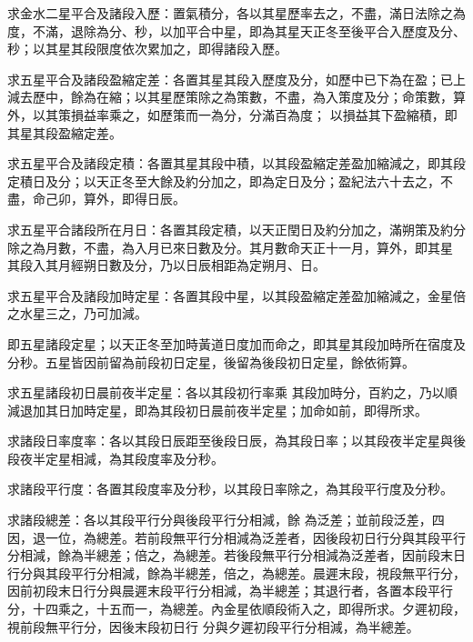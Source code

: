 \begin{pinyinscope}
 求金水二星平合及諸段入歷：置氣積分，各以其星歷率去之，不盡，滿日法除之為度，不滿，退除為分、秒，以加平合中星，即為其星天正冬至後平合入歷度及分、秒；以其星其段限度依次累加之，即得諸段入歷。



 求五星平合及諸段盈縮定差：各置其星其段入歷度及分，如歷中已下為在盈；已上減去歷中，餘為在縮；以其星歷策除之為策數，不盡，為入策度及分；命策數，算外，以其策損益率乘之，如歷策而一為分，分滿百為度；
 以損益其下盈縮積，即其星其段盈縮定差。



 求五星平合及諸段定積：各置其星其段中積，以其段盈縮定差盈加縮減之，即其段定積日及分；以天正冬至大餘及約分加之，即為定日及分；盈紀法六十去之，不盡，命己卯，算外，即得日辰。



 求五星平合諸段所在月日：各置其段定積，以天正閏日及約分加之，滿朔策及約分除之為月數，不盡，為入月已來日數及分。其月數命天正十一月，算外，即其星
 其段入其月經朔日數及分，乃以日辰相距為定朔月、日。



 求五星平合及諸段加時定星：各置其段中星，以其段盈縮定差盈加縮減之，金星倍之水星三之，乃可加減。



 即五星諸段定星；以天正冬至加時黃道日度加而命之，即其星其段加時所在宿度及分秒。五星皆因前留為前段初日定星，後留為後段初日定星，餘依術算。



 求五星諸段初日晨前夜半定星：各以其段初行率乘
 其段加時分，百約之，乃以順減退加其日加時定星，即為其段初日晨前夜半定星；加命如前，即得所求。



 求諸段日率度率：各以其段日辰距至後段日辰，為其段日率；以其段夜半定星與後段夜半定星相減，為其段度率及分秒。



 求諸段平行度：各置其段度率及分秒，以其段日率除之，為其段平行度及分秒。



 求諸段總差：各以其段平行分與後段平行分相減，餘
 為泛差；並前段泛差，四因，退一位，為總差。若前段無平行分相減為泛差者，因後段初日行分與其段平行分相減，餘為半總差；倍之，為總差。若後段無平行分相減為泛差者，因前段末日行分與其段平行分相減，餘為半總差，倍之，為總差。晨遲末段，視段無平行分，因前初段末日行分與晨遲末段平行分相減，為半總差；其退行者，各置本段平行分，十四乘之，十五而一，為總差。內金星依順段術入之，即得所求。夕遲初段，視前段無平行分，因後末段初日行
 分與夕遲初段平行分相減，為半總差。




\end{pinyinscope}
